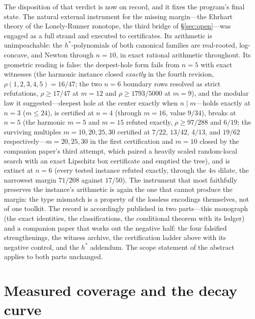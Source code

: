\documentclass[11pt,a4paper]{article}
\numberwithin{equation}{section}
\theoremstyle{plain}
\theoremstyle{plain}
\theoremstyle{definition}
\theoremstyle{remark}
\begin{document}
The disposition of that verdict is now on record, and it fixes the
program's final state. The natural external instrument for the missing
margin---the Ehrhart theory of the Lonely-Runner zonotope, the third
bridge of \S\ref{sec:open}---was engaged as a full strand and executed
to certificates. Its arithmetic is unimpeachable: the $h^*$-polynomials
of both canonical families are real-rooted, log-concave, and Newton
through $n=10$, in exact rational arithmetic throughout. Its geometric
reading is false: the deepest-hole form fails from $n=5$ with exact
witnesses (the harmonic instance closed \emph{exactly} in the fourth
revision, $\rho(1,2,3,4,5)=16/47$; the two $n=6$ boundary rows
resolved as strict refutations, $\rho\ge17/47$ at $m=12$ and
$\rho\ge1793/5000$ at $m=9$),
and the modular law it suggested---deepest hole at the center exactly
when $n\mid m$---holds exactly at $n=3$ ($m\le 24$), is certified at
$n=4$ (through $m=16$, value $9/34$), breaks at $n=5$ (the harmonic
$m=5$ and $m=15$ refuted exactly, $\rho\ge 97/288$ and $6/19$; the
surviving multiples $m=10,20,25,30$ certified at $7/22$, $13/42$,
$4/13$, and $19/62$ respectively---$m=20,25,30$ in the first
certification and $m=10$ closed by the companion paper's
third attempt, which paired a heavily scaled random-local
search with an exact Lipschitz box certificate and emptied the tree),
and is
extinct at $n=6$ (every tested instance refuted exactly, through the
$4n$ dilate, the narrowest margin $71/208$ against $17/50$). The
instrument that most faithfully preserves the instance's arithmetic is
again the one that cannot produce the margin: the type mismatch is a
property of the lossless encodings themselves, not of one toolkit.
The record is accordingly published in two parts---this monograph (the
exact identities, the classifications, the conditional theorem with
its ledger) and a companion paper \cite{companion-paper} that works
out the negative half: the four falsified strengthenings, the witness
archive, the certification ladder above with its negative control, and
the $h^*$ addendum. The scope statement of the abstract applies to
both parts unchanged.


\section{Measured coverage and the decay curve}\label{sec:measure}
\end{document}
